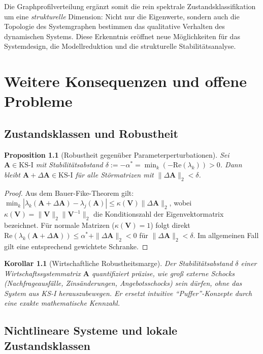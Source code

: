 ﻿\documentclass[12pt, a4paper, titlepage]{report}
\newtheorem{proposition}[theorem]{Proposition}
\newtheorem{corollary}[theorem]{Korollar}
\theoremstyle{definition}
\theoremstyle{remark}
\newcommand{\vA}{\bm{A}}
\newcommand{\vV}{\bm{V}}
\newcommand{\re}{\mathrm{Re}}
\newcommand{\KS}{\mathrm{KS}}
\begin{document}
Die Graphprofilverteilung ergänzt somit die rein spektrale Zustandsklassifikation
um eine \emph{strukturelle} Dimension: Nicht nur die Eigenwerte, sondern auch die
Topologie des Systemgraphen bestimmen das qualitative Verhalten des dynamischen Systems.
Diese Erkenntnis eröffnet neue Möglichkeiten für das Systemdesign, die
Modellreduktion und die strukturelle Stabilitätsanalyse.

\chapter{Weitere Konsequenzen und offene Probleme}
\label{sec:konsequenzen}

\section{Zustandsklassen und Robustheit}

\begin{proposition}[Robustheit gegenüber Parameterperturbationen]
\label{prop:robustheit}
Sei $\vA \in \KS\text{-I}$ mit Stabilitätsabstand
$\delta := -\alpha^* = \min_k(-\re(\lambda_k)) > 0$. Dann bleibt $\vA + \Delta\vA \in \KS\text{-I}$
für alle Störmatrizen mit $\|\Delta\vA\|_2 < \delta$.
\end{proposition}

\begin{proof}
Aus dem Bauer-Fike-Theorem gilt: $\min_{k}|\lambda_k(\vA+\Delta\vA) - \lambda_j(\vA)| \leq \kappa(\vV)\|\Delta\vA\|_2$,
wobei $\kappa(\vV) = \|\vV\|_2\|\vV^{-1}\|_2$ die Konditionszahl der Eigenvektormatrix
bezeichnet. Für normale Matrizen ($\kappa(\vV)=1$) folgt direkt
$\re(\lambda_k(\vA+\Delta\vA)) \leq \alpha^* + \|\Delta\vA\|_2 < 0$
für $\|\Delta\vA\|_2 < \delta$. Im allgemeinen Fall gilt eine entsprechend gewichtete
Schranke. \qedhere
\end{proof}

\begin{corollary}[Wirtschaftliche Robustheitsmarge]
Der Stabilitätsabstand $\delta$ einer Wirtschaftssystemmatrix $\vA$ quantifiziert
präzise, wie groß externe Schocks (Nachfrageausfälle, Zinsänderungen, Angebotsschocks)
sein dürfen, ohne das System aus KS-I herauszubewegen. Er ersetzt intuitive
``Puffer''-Konzepte durch eine exakte mathematische Kennzahl.
\end{corollary}

\section{Nichtlineare Systeme und lokale Zustandsklassen}
\end{document}
